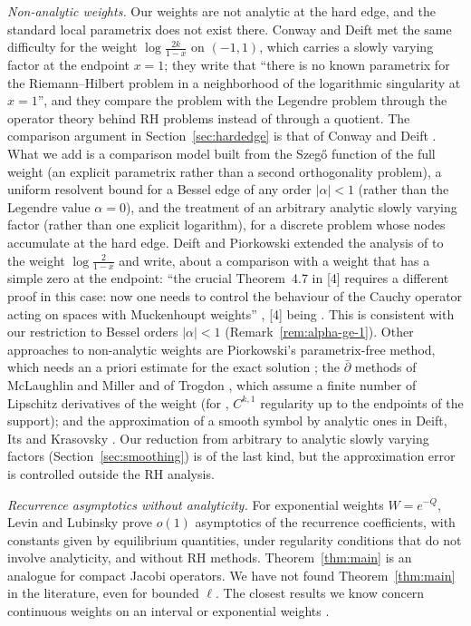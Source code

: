 \emph{Non-analytic weights.} Our weights are not analytic at the hard edge, and the standard local parametrix does not
exist there. Conway and Deift \cite{CD} met the same difficulty for the weight $\log\frac{2k}{1-x}$ on $(-1,1)$, which
carries a slowly varying factor at the endpoint $x=1$; they write that ``there is no known parametrix for the
Riemann--Hilbert problem in a neighborhood of the logarithmic singularity at $x=1$'', and they compare the problem with
the Legendre problem through the operator theory behind RH problems instead of through a quotient. The comparison
argument in Section~\ref{sec:hardedge} is that of Conway and Deift \cite[Theorem~4.7 and Proposition~4.9]{CD}. What
we add is a comparison model built from the Szeg\H{o} function of the full weight (an explicit parametrix rather than a
second orthogonality problem), a uniform resolvent bound for a Bessel edge of any order $|\alpha|<1$ (rather than the
Legendre value $\alpha=0$), and the treatment of an arbitrary analytic slowly varying factor (rather than one explicit
logarithm), for a discrete problem whose nodes accumulate at the hard edge. Deift and
Piorkowski \cite{DP} extended the analysis of \cite{CD} to the weight $\log\frac{2}{1-x}$ and write, about a comparison
with a weight that has a simple zero at the endpoint: ``the crucial Theorem~4.7 in [4] requires a different proof in
this case: now one needs to control the behaviour of the Cauchy operator acting on spaces with Muckenhoupt weights''
\cite[\S1]{DP}, [4] being \cite{CD}. This is consistent with our restriction to Bessel orders $|\alpha|<1$
(Remark~\ref{rem:alpha-ge-1}). Other approaches to non-analytic weights are Piorkowski's parametrix-free method, which
needs an a priori estimate for the exact solution \cite{Pio}; the $\bar\partial$ methods of McLaughlin and Miller
\cite{MM} and of Trogdon \cite{Tro}, which assume a finite number of Lipschitz derivatives of the weight (for
\cite{Tro}, $C^{k,1}$ regularity up to the endpoints of the support); and the approximation of a smooth symbol by
analytic ones in Deift, Its and Krasovsky \cite[\S6.2]{DIK}. Our reduction from arbitrary to analytic slowly varying
factors (Section~\ref{sec:smoothing}) is of the last kind, but the approximation error is controlled outside the RH
analysis.

\emph{Recurrence asymptotics without analyticity.} For exponential weights $W=e^{-Q}$, Levin and Lubinsky
\cite{LL} prove $o(1)$ asymptotics of the recurrence coefficients, with constants given by equilibrium quantities, under
regularity conditions that do not involve analyticity, and without RH methods. Theorem~\ref{thm:main} is an analogue
for compact Jacobi operators. We have not found Theorem~\ref{thm:main} in the literature, even for bounded $\ell$. The
closest results we know concern continuous weights on an interval \cite{CD,DP,Pio,Tro,MM} or exponential weights
\cite{LL}.

